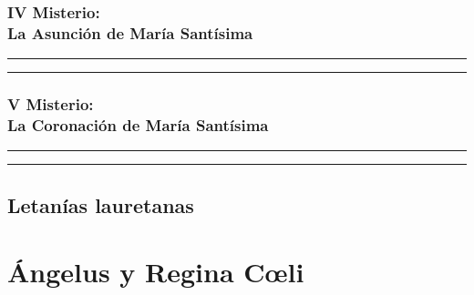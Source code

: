\documentclass[11pt,a4paper]{report}
\begin{document}
    \subsubsection*{IV Misterio:\\ La Asunción de María Santísima}
    
    
    \rule{\textwidth}{0.5pt}
    
    \rule{\textwidth}{0.5pt}
    

    \subsubsection*{V Misterio:\\ La Coronación de María Santísima}
    
    
    \rule{\textwidth}{0.5pt}
    
    \rule{\textwidth}{0.5pt}
    

    

    \subsection*{Letanías lauretanas}
    

    \section*{Ángelus y Regina Cœli}
    
    
\end{document}
